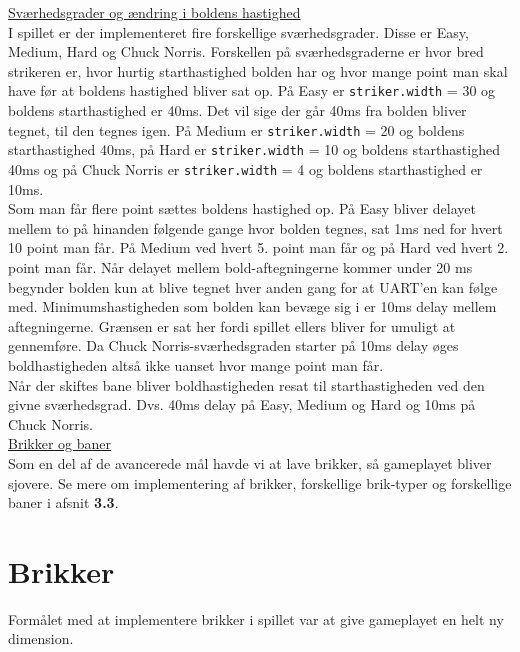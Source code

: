 \underline{Sværhedsgrader og ændring i boldens hastighed}\\

I spillet er der implementeret fire forskellige sværhedsgrader. Disse er Easy, Medium, Hard og Chuck Norris. Forskellen på sværhedsgraderne er hvor bred strikeren er, hvor hurtig starthastighed bolden har og hvor mange point man skal have før at boldens hastighed bliver sat op. På Easy er \texttt{striker.width} = 30 og boldens starthastighed er 40ms. Det vil sige der går 40ms fra bolden bliver tegnet, til den tegnes igen. På Medium er \texttt{striker.width} = 20 og boldens starthastighed 40ms, på Hard er \texttt{striker.width} = 10 og boldens starthastighed 40ms og på Chuck Norris er \texttt{striker.width} = 4 og boldens starthastighed er 10ms.\\

Som man får flere point sættes boldens hastighed op. På Easy bliver delayet mellem to på hinanden følgende gange hvor bolden tegnes, sat 1ms ned for hvert 10 point man får. På Medium ved hvert 5. point man får og på Hard ved hvert 2. point man får. Når delayet mellem bold-aftegningerne kommer under 20 ms begynder bolden kun at blive tegnet hver anden gang for at UART'en kan følge med. Minimumshastigheden som bolden kan bevæge sig i er 10ms delay mellem aftegningerne. Grænsen er sat her fordi spillet ellers bliver for umuligt at gennemføre. Da Chuck Norris-sværhedsgraden starter på 10ms delay øges boldhastigheden altså ikke uanset hvor mange point man får.\\
Når der skiftes bane bliver boldhastigheden resat til starthastigheden ved den givne sværhedsgrad. Dvs. 40ms delay på Easy, Medium og Hard og 10ms på Chuck Norris.\\

\underline{Brikker og baner}\\

Som en del af de avancerede mål havde vi at lave brikker, så gameplayet bliver sjovere. Se mere om implementering af brikker, forskellige brik-typer og forskellige baner i afsnit \textbf{3.3}. \\

\section{Brikker}

Formålet med at implementere brikker i spillet var at give gameplayet en helt ny dimension.\\

